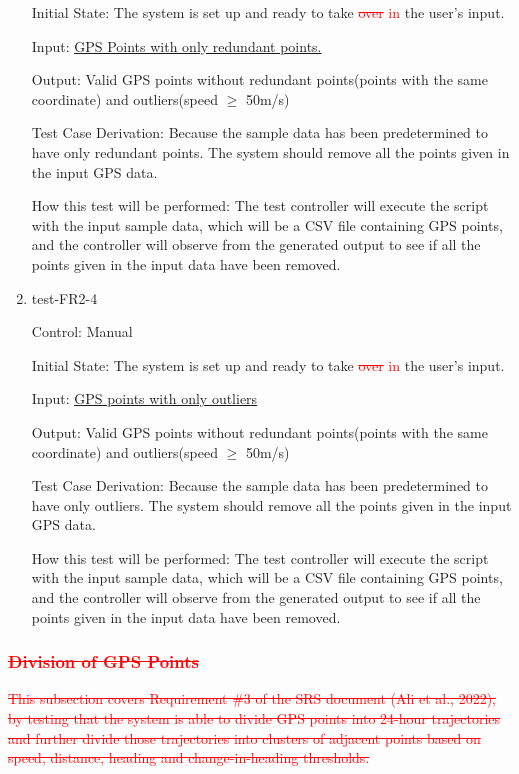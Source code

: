 \documentclass[12pt, titlepage]{article}
\begin{document}
\begin{enumerate}
Initial State: The system is set up and ready to take \textcolor{red}{\sout{over} in} the user's input.
					
Input: \href{https://github.com/paezha/PyERT-BLACK/blob/rev0-test/test/test_data/fr-tests/fr2-3-in.csv}{GPS Points with only redundant points.}
					
Output: Valid GPS points without redundant points(points with the same coordinate) and outliers(speed $\geq$ 50m/s)

Test Case Derivation: Because the sample data has been predetermined to have only redundant points. The system should remove all the points given in the input GPS data.

How this test will be performed: The test controller will execute the script with the input sample data, which will be a CSV file containing GPS points, and the controller will observe from the generated output to see if all the points given in the input data have been removed.

\item{test-FR2-4} \label{test-FR2-4}

Control: Manual
					
Initial State: The system is set up and ready to take \textcolor{red}{\sout{over} in} the user's input.
					
Input: \href{https://github.com/paezha/PyERT-BLACK/blob/rev0-test/quarto-example/data/sample-gps/sample-gps-8.csv}{GPS points with only outliers}
					
Output: Valid GPS points without redundant points(points with the same coordinate) and outliers(speed $\geq$ 50m/s)

Test Case Derivation: Because the sample data has been predetermined to have only outliers. The system should remove all the points given in the input GPS data.

How this test will be performed: The test controller will execute the script with the input sample data, which will be a CSV file containing GPS points, and the controller will observe from the generated output to see if all the points given in the input data have been removed.

\end{enumerate}

\subsubsection{\textcolor{red}{\sout{Division of GPS Points}}}

\textcolor{red}{\sout{This subsection covers Requirement \#3 of the SRS document (Ali et al., 2022), by testing that the system is able to divide GPS points into 24-hour trajectories and further divide those trajectories into clusters of adjacent points based on speed, distance, heading and change-in-heading thresholds.}}
\end{document}
